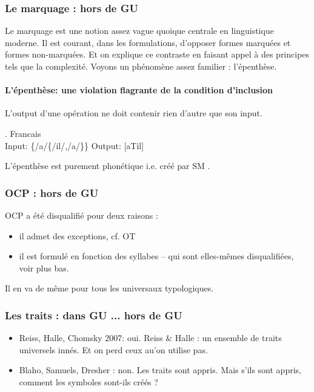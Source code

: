 	  \subsubsection{Le marquage : hors de GU}
	    Le marquage est une notion assez vague quoique centrale en linguistique moderne. Il est courant, dans les formulations, d'opposer formes marqu\'ees et formes non-marqu\'ees. Et on explique ce contraste en faisant appel \`a des principes tels que la complexit\'e. Voyons un ph\'enom\`ene assez familier : l'\'epenth\`ese.
	    \paragraph{L'\'epenth\`ese: une violation flagrante de la condition d'inclusion}
	    
	    \begin{defin}
	      L'output d'une opération ne doit contenir rien d'autre que son input.
	    \end{defin}
	    \ex. Francais \\
	    Input: \{/a/\{/il/,/a/\}\}
	    Output: [aTil]
	    	    
	     
	    L'\'epenth\`ese est purement phon\'etique i.e. cr\'e\'e par SM \cite[voir][]{samuels2009structure}.
	  \subsubsection{OCP : hors de GU}
	  OCP a \'et\'e disqualifi\'e pour deux raisons : 
	  \begin{itemize}
	  	\item il admet des exceptions, cf. OT
	  	\item il est formul\'e en fonction des syllabes -- qui sont elles-m\^emes disqualifi\'ees, voir plus bas.
	  \end{itemize}
      Il en va de m\^eme pour tous les universaux typologiques.
	  \subsubsection[Inn\'eit\'e des traits phonologiques]{Les traits : dans GU ... hors de GU}
	    
	    \begin{itemize}
	      \item Reiss, Halle, Chomsky 2007: oui. Reiss \& Halle : un ensemble de traits universels innés. Et on perd ceux au'on utilise pas.
	      \item Blaho, Samuels, Dresher : non. Les traits sont appris. Mais s'ils sont appris, comment les symboles sont-ils cr\'e\'es ?
	    \end{itemize} 
